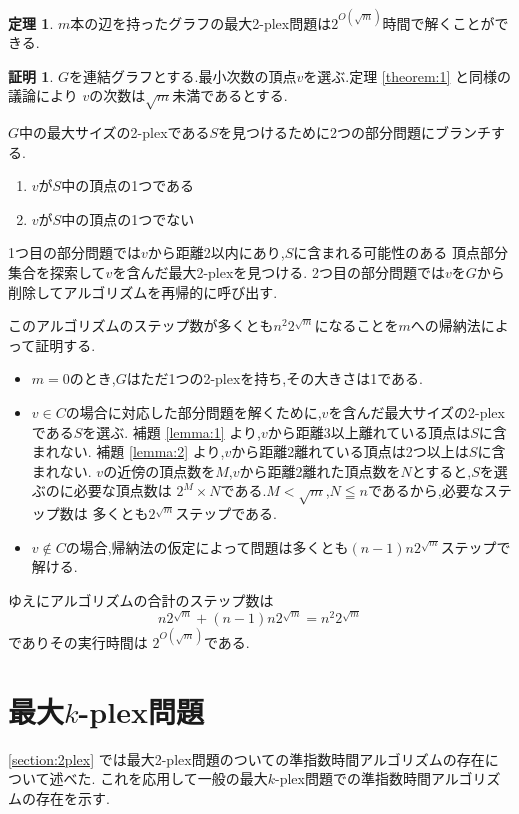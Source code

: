 \documentclass{thesis}
\theoremstyle{definition}
\newtheorem{theorem}{定理}[chapter]
\newtheorem*{prf*}{証明}
\begin{document}
\begin{theorem} \label{theorem:2}
$m$本の辺を持ったグラフの最大2-plex問題は$2^{O(\sqrt{m})}$時間で解くことができる.
\begin{prf*}
$G$を連結グラフとする.最小次数の頂点$v$を選ぶ.定理 \ref{theorem:1} と同様の議論により
$v$の次数は$\sqrt{m}$未満であるとする.

$G$中の最大サイズの2-plexである$S$を見つけるために2つの部分問題にブランチする.
\begin{enumerate}
 \item $v$が$S$中の頂点の1つである
 \item $v$が$S$中の頂点の1つでない
\end{enumerate}
1つ目の部分問題では$v$から距離2以内にあり,$S$に含まれる可能性のある
頂点部分集合を探索して$v$を含んだ最大2-plexを見つける.
2つ目の部分問題では$v$を$G$から削除してアルゴリズムを再帰的に呼び出す.

このアルゴリズムのステップ数が多くとも$n^{2}2^{\sqrt{m}}$になることを$m$への帰納法によって証明する.
\begin{itemize}
 \item $m = 0$のとき,$G$はただ1つの2-plexを持ち,その大きさは1である.	
 \item $v \in C$の場合に対応した部分問題を解くために,$v$を含んだ最大サイズの2-plexである$S$を選ぶ.
補題  \ref{lemma:1} より,$v$から距離3以上離れている頂点は$S$に含まれない.
補題  \ref{lemma:2} より,$v$から距離2離れている頂点は2つ以上は$S$に含まれない.
$v$の近傍の頂点数を$M$,$v$から距離2離れた頂点数を$N$とすると,$S$を選ぶのに必要な頂点数は %
$2^{M} \times N$である.$M < \sqrt{m}$,$N \leqq n$であるから,必要なステップ数は
多くとも$2^{\sqrt{m}}$ステップである.
 \item $v \notin C$の場合,帰納法の仮定によって問題は多くとも$(n - 1)n2^{\sqrt{m}}$ステップで解ける.
\end{itemize}
ゆえにアルゴリズムの合計のステップ数は
\[  n2^{\sqrt{m}} +  (n - 1)n2^{\sqrt{m}} = n^{2}2^{\sqrt{m}} \]
でありその実行時間は $2^{O(\sqrt{m})}$である.
\end{prf*}
\end{theorem}

\section{最大$k$-plex問題} \label{section:kplex}
 \ref{section:2plex} では最大2-plex問題のついての準指数時間アルゴリズムの存在について述べた.
これを応用して一般の最大$k$-plex問題での準指数時間アルゴリズムの存在を示す.
\end{document}
